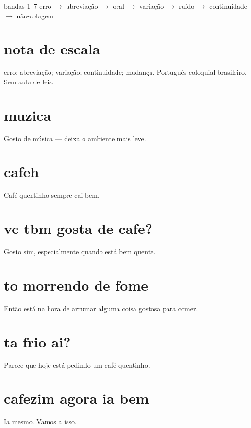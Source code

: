 \documentclass[11pt,a4paper]{article}
\newcommand{\code}[1]{\texttt{\small #1}}
\begin{document}
       {bandas 1--7}
       {erro $\to$ abreviação $\to$ oral $\to$ variação $\to$ ruído $\to$ continuidade $\to$ não-colagem}
\maketitle
\begin{abstract}
Corpus de regressão linguística para a histerese operacional:
a assistente responde de forma banal sem ``você quis dizer\ldots''.
A teoria fica no Corpo de Peano; aqui só há situações.
Semente: \code{tools/vizinhanca.sh}. Bateria: \code{tools/bench\_vizinhanca.sh}.
\end{abstract}

\section{nota de escala}
erro; abreviação; variação; continuidade; mudança.
Português coloquial brasileiro. Sem aula de leis.

\section{muzica}
Gosto de música --- deixa o ambiente mais leve.

\section{cafeh}
Café quentinho sempre cai bem.

\section{vc tbm gosta de cafe?}
Gosto sim, especialmente quando está bem quente.

\section{to morrendo de fome}
Então está na hora de arrumar alguma coisa gostosa para comer.

\section{ta frio ai?}
Parece que hoje está pedindo um café quentinho.

\section{cafezim agora ia bem}
Ia mesmo. Vamos a isso.
\end{document}
